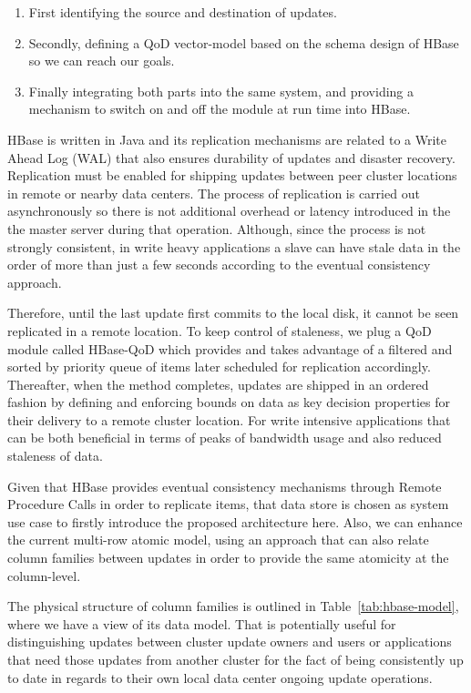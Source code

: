 \begin{enumerate}
\item First identifying the source and destination of updates.
\item Secondly, defining a QoD vector-model based on the schema design of HBase so we can reach our goals.
\item Finally integrating both parts into the same system, and providing a mechanism to switch on and off the module at run time into HBase.
\end{enumerate}

HBase is written in Java and its replication mechanisms are related to a Write Ahead Log (WAL) that also ensures durability of updates and disaster recovery. Replication must be enabled for shipping updates between peer cluster locations in remote or nearby data centers. The process of replication is carried out asynchronously so there is not additional overhead or latency introduced in the the master server during that operation.  Although, since the process is not strongly consistent, in write heavy applications a slave can have stale data in the order of more than just a few seconds according to the eventual consistency approach.

Therefore, until the last update first commits to the local disk, it cannot be seen replicated in a remote location. To keep control of staleness, we plug a QoD module called HBase-QoD which provides and takes advantage of a filtered and sorted by priority queue of items later scheduled for replication accordingly. Thereafter, when the method completes, updates are shipped in an ordered fashion by defining and enforcing bounds on data as key decision properties for their delivery to a remote cluster location. For write intensive applications that can be both beneficial in terms of peaks of bandwidth usage and also reduced staleness of data.

Given that HBase provides eventual consistency mechanisms through Remote Procedure Calls in order to replicate items, that data store is chosen as system use case to firstly introduce the proposed architecture here. Also, we can enhance the current multi-row atomic model, using an approach that can also relate column families between updates in order to provide the same atomicity at the column-level.

The physical structure of column families is outlined in Table~\ref{tab:hbase-model}, where we have a view of its data model. That is potentially useful for distinguishing updates between cluster update owners and users or applications that need those updates from another cluster for the fact of being consistently up to date in regards to their own local data center ongoing update operations.

